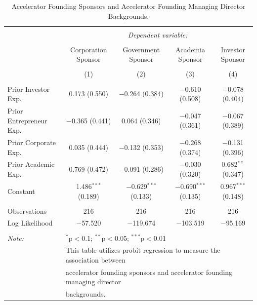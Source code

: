 \documentclass[
  12pt,
]{article}
\begin{document}
\begin{table}[H] \centering 
  \caption{Accelerator Founding Sponsors and Accelerator Founding Managing Director Backgrounds.} 
  \label{tab:accsponmdback} 
\scriptsize 
\begin{tabular}{@{\extracolsep{1pt}}lcccc} 
\\[-1.8ex]\hline 
\hline \\[-1.8ex] 
 & \multicolumn{4}{c}{\textit{Dependent variable:}} \\ 
\cline{2-5} 
\\[-1.8ex] & Corporation Sponsor & Government Sponsor & Academia Sponsor & Investor Sponsor \\ 
\\[-1.8ex] & (1) & (2) & (3) & (4)\\ 
\hline \\[-1.8ex] 
 Prior Investor Exp. & 0.173 (0.550) & $-$0.264 (0.384) & $-$0.610 (0.508) & $-$0.078 (0.404) \\ 
  Prior Entrepreneur Exp. & $-$0.365 (0.441) & 0.064 (0.346) & $-$0.047 (0.361) & $-$0.067 (0.389) \\ 
  Prior Corporate Exp. & 0.035 (0.444) & $-$0.132 (0.353) & $-$0.268 (0.374) & $-$0.131 (0.396) \\ 
  Prior Academic Exp. & 0.769 (0.472) & $-$0.091 (0.286) & $-$0.030 (0.320) & 0.682$^{**}$ (0.347) \\ 
  Constant & 1.486$^{***}$ (0.189) & $-$0.629$^{***}$ (0.133) & $-$0.690$^{***}$ (0.135) & 0.967$^{***}$ (0.148) \\ 
 \hline \\[-1.8ex] 
Observations & 216 & 216 & 216 & 216 \\ 
Log Likelihood & $-$57.520 & $-$119.674 & $-$103.519 & $-$95.169 \\ 
\hline 
\hline \\[-1.8ex] 
\textit{Note:}  & \multicolumn{4}{l}{$^{*}$p$<$0.1; $^{**}$p$<$0.05; $^{***}$p$<$0.01} \\ 
 & \multicolumn{4}{l}{This table utilizes probit regression to measure the association between } \\ 
 & \multicolumn{4}{l}{accelerator founding sponsors and accelerator founding managing director } \\ 
 & \multicolumn{4}{l}{backgrounds.} \\ 
\end{tabular} 
\end{table}

\end{document}
